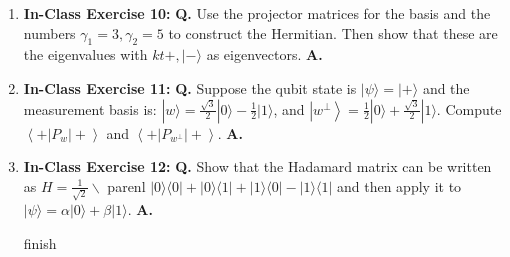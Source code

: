 \documentclass[main.tex]{subfiles}
\begin{document}
\begin{enumerate}
\begin{enumerate}
\begin{enumerate}
\begin{align*}
\begin{array}{l}
                                                    \frac{-\sqrt{3}+1}{4\sqrt{2}}\end{array}\right]\\
                    |\psi_{N_{w^{\perp}}}\rangle    & = \frac{|\psi_{P_{w^{\perp}}}\rangle}{||\psi_{P_{w^{\perp}}}\rangle|}\\
                                                    & = \left(\frac{2+\sqrt{3}}{4}\right)^{-\frac{1}{2}}
                                                    \left[\begin{array}{l} \frac{1+\sqrt{3}}{4\sqrt{2}} \\
                                                    \frac{\sqrt{3}+3}{4\sqrt{2}}\end{array}\right]\\
                \end{align*}
        \end{enumerate}
    \end{enumerate}
    
     \textbf{Q.} Confirm that you get the same results as in Exercise 1. \textbf{A.} The probabilities are the same.

\item[] \textbf{In-Class Exercise 10:}  \textbf{Q.} Use the projector matrices for the basis and the numbers $\gamma_{1}=3, \gamma_{2}=5$ to construct the Hermitian. Then show that these are the eigenvalues with $k t+,|-\rangle$ as eigenvectors.  \textbf{A.}

\item[] \textbf{In-Class Exercise 11:}  \textbf{Q.} Suppose the qubit state is $|\psi\rangle=|+\rangle$ and the measurement basis is: $|w\rangle=\frac{\sqrt{3}}{2}|0\rangle-\frac{1}{2}|1\rangle$, and $\left|w^{\perp}\right\rangle=\frac{1}{2}|0\rangle+\frac{\sqrt{3}}{2}|1\rangle .$ Compute $\left\langle+\left|P_{w}\right|+\right\rangle$ and $\left\langle+\left|P_{w^{\perp}}\right|+\right\rangle .$  \textbf{A.}

\item[] \textbf{In-Class Exercise 12:}  \textbf{Q.} Show that the Hadamard matrix can be written as $H=\frac{1}{\sqrt{2}} \backslash$ parenl $|0\rangle\langle 0|+| 0\rangle\langle 1|+| 1\rangle\langle 0|-| 1\rangle\langle 1|$ and then apply it to $|\psi\rangle=\alpha|0\rangle+\beta|1\rangle .$  \textbf{A.}

finish

\end{enumerate}
\end{document}

